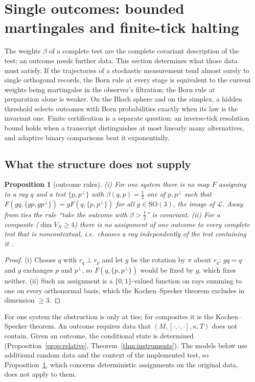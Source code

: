 \documentclass[aps,pra,onecolumn,superscriptaddress,nofootinbib,10pt]{revtex4-2}
\newtheorem{proposition}[theorem]{Proposition}
\theoremstyle{definition}
\theoremstyle{remark}
\newcommand{\cL}{\mathcal{L}}
\newcommand{\hp}[3]{[#1,#2,#3]}
\newcommand{\SO}{\mathrm{SO}}
\begin{document}
\section{Single outcomes: bounded martingales and finite-tick halting}\label{sec:outcomes}
The weights $\beta$ of a complete test are the complete covariant description of the test; an outcome needs
further data.  This section determines what those data must satisfy.  If the trajectories of a
stochastic measurement tend almost surely to single orthogonal records, the Born rule at every stage is
equivalent to the current weights being martingales in the observer's filtration; the Born rule at
preparation alone is weaker.  On the Bloch sphere and on the simplex, a hidden threshold selects outcomes
with Born probabilities exactly when its law is the invariant one.  Finite certification is a separate
question: an inverse-tick resolution bound holds when a transcript distinguishes at most linearly many
alternatives, and adaptive binary comparisons beat it exponentially.

\subsection{What the structure does not supply}

\begin{proposition}[outcome rules]\label{prop:nooutcome}
(i) For one system there is no map $F$ assigning to a ray $q$ and a test $\{p,p^\perp\}$ with
$\beta(q,p)=\tfrac12$ one of $p,p^\perp$ such that $F(gq,\{gp,gp^\perp\})=gF(q,\{p,p^\perp\})$ for all
$g\in\SO(3)$, the image of $\cL$.  Away from ties the rule ``take the outcome with $\beta>\frac12$'' is
covariant.
(ii) For a composite ($\dim V_N\ge4$) there is no assignment of one outcome to every
complete test that is noncontextual, i.e.\ chooses a ray independently of the test containing it
\cite{KS67,Bell66}.
\end{proposition}
\begin{proof}
(i) Choose $q$ with $r_q\perp r_p$ and let $g$ be the rotation by $\pi$ about $r_q$: $gq=q$ and $g$ exchanges
$p$ and $p^\perp$, so $F(q,\{p,p^\perp\})$ would be fixed by $g$, which fixes neither.  (ii) Such an assignment
is a $\{0,1\}$-valued function on rays summing to one on every orthonormal basis, which the
Kochen--Specker theorem excludes in dimension $\ge3$.
\end{proof}
For one system the obstruction is only at ties; for composites it is the Kochen--Specker theorem.  An
outcome requires data that $(M,\hp{\cdot}{\cdot}{\cdot},\kappa,T)$ does not contain.  Given an outcome, the conditional
state is determined (Proposition~\ref{prop:relative}, Theorem~\ref{thm:instruments}).  The models below use additional
random data and the context of the implemented test, so Proposition~\ref{prop:nooutcome}, which concerns
deterministic assignments on the original data, does not apply to them.
\end{document}
